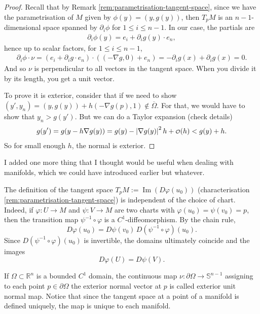 \begin{proof}
	Recall that by Remark \ref{rem:parametrisation-tangent-space}, since we have the parametrisation of $M$ given by $\phi(y) = (y, g(y))$, then $T_{p}M$ is an $n-1$-dimensional space spanned by $\partial_{i} \phi$ for $1 \leq i \leq n-1$. In our case, the partials are
	\begin{align*}
		\partial_{i} \phi(y) = e_{i} + \partial_{i} g (y) \cdot e_{n},
	\end{align*}
	hence up to scalar factors, for $1 \leq i \leq n-1$,
	\begin{align*}
		\partial_{i} \phi \cdot \nu = (e_{i} + \partial_{i} g \cdot  e_{n}) \cdot ( (-\nabla g, 0) + e_{n}) = -\partial_{i} g(x) + \partial_{i} g(x) = 0.
	\end{align*}
	And so $\nu$ is perpendicular to all vectors in the tangent space. When you divide it by its length, you get a unit vector.

	To prove it is exterior, consider that if we need to show $(y', y_{n}) = (y,g(y)) + h (-\nabla g(p), 1) \not \in \overline{ \Omega } $. For that, we would have to show that $y_{n} > g(y')$. But we can do a Taylor expansion (check details)
	\begin{align*}
		g(y') = g(y - h \nabla g(y)) = g(y) - \left| \nabla g(y) \right|^{2} h + \smalO(h) < g(y) + h.
	\end{align*}
	So for small enough $h$, the normal is exterior.
\end{proof}

I added one more thing that I thought would be useful when dealing with manifolds, which we could have introduced earlier but whatever.

\begin{remark}
	The definition of the tangent space $T_p M := \operatorname{Im}(D\varphi(u_0))$ (characterisation \ref{rem:parametrisation-tangent-space}) is independent of the choice of chart. Indeed, if $\varphi: U \to M$ and $\psi: V \to M$ are two charts with $\varphi(u_0)=\psi(v_0)=p$, then the transition map $\psi^{-1}\circ\varphi$ is a $C^1$-diffeomorphism. By the chain rule,
	\[
		D\varphi(u_0) = D\psi(v_0)\, D(\psi^{-1}\circ\varphi)(u_0).
	\]
	Since $D(\psi^{-1}\circ\varphi)(u_0)$ is invertible, the domains ultimately coincide and the images
	\[
		D\varphi(U) = D\psi(V).
	\]
\end{remark}

\begin{definition}\label{def:ext-unit-map}
	If $\Omega \subset \mathbb{R}^n$ is a bounded $C^1$ domain, the continuous map $\nu: \partial \Omega \rightarrow \mathbb{S}^{n-1}$ assigning to each point $p \in \partial \Omega$ the exterior normal vector at $p$ is called exterior unit normal map. Notice that since the tangent space at a point of a manifold is defined uniquely, the map is unique to each manifold.
\end{definition}

